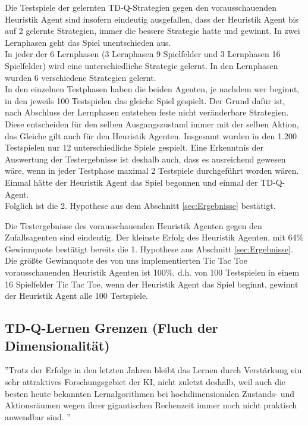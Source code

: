 
Die Testspiele der gelernten TD-Q-Strategien gegen den vorausschauenden Heuristik Agent sind insofern eindeutig ausgefallen, dass der Heuristik Agent bis auf 2 gelernte Strategien, immer die bessere Strategie hatte und gewinnt. In zwei Lernphasen geht das Spiel unentschieden aus. \\

In jeder der 6 Lernphasen (3 Lernphasen 9 Spielfelder und 3 Lernphasen 16 Spielfelder) wird eine unterschiedliche Strategie gelernt. In den Lernphasen wurden 6 verschiedene Strategien gelernt. \\

In den einzelnen Testphasen haben die beiden Agenten, je nachdem wer beginnt, in den jeweils 100 Testspielen das gleiche Spiel gespielt. Der Grund dafür ist, nach Abschluss der Lernphasen entstehen feste nicht veränderbare Strategien. Diese entscheiden für den selben Ausgangszustand immer mit der selben Aktion, das Gleiche gilt auch für den Heuristik Agenten. Insgesamt wurden in den 1.200 Testspielen nur 12 unterschiedliche Spiele gespielt. Eine Erkenntnis der Auswertung der Testergebnisse ist deshalb auch, dass es  ausreichend gewesen wäre, wenn in jeder Testphase maximal 2 Testspiele durchgeführt worden wären. Einmal hätte der Heuristik Agent das Spiel begonnen und einmal der TD-Q-Agent. \\ 

Folglich ist die 2. Hypothese aus dem Abschnitt \ref{sec:Ergebnisse} bestätigt. \\


Die Testergebnisse des vorausschauenden Heuristik Agenten gegen den Zufallsagenten sind eindeutig. Der kleinste Erfolg des Heuristik Agenten, mit 64\% Gewinnquote bestätigt bereits die 1. Hypothese aus Abschnitt \ref{sec:Ergebnisse}. Die größte Gewinnquote des von uns implementierten Tic Tac Toe vorausschauenden Heuristik Agenten ist 100\%, d.h. von 100 Testspielen in einem 16 Spielfelder Tic Tac Toe, wenn der Heuristik Agent das Spiel beginnt, gewinnt der Heuristik Agent alle 100 Testspiele. \\

\subsection{TD-Q-Lernen Grenzen (Fluch der Dimensionalität)}
\label{subsec:TD-Q-Lernen Grenzen}
''Trotz der Erfolge in den letzten Jahren bleibt das Lernen durch Verstärkung ein sehr attraktives Forschungsgebiet der KI, nicht zuletzt deshalb, weil auch die besten heute bekannten Lernalgorithmen bei hochdimensionalen Zustands- und Aktionsräumen wegen ihrer gigantischen Rechenzeit immer noch nicht praktisch anwendbar sind. \cite[305]{Ertel}''\\

